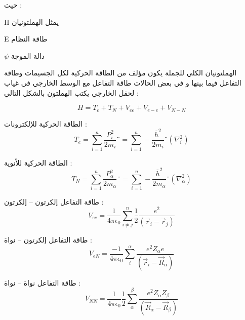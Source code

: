 حيث :
\begin{list}{}{}
	\item 
	H  يمثل الهملتونيان 
	\item 
	E  طاقة النظام
	\item 
	$ \psi $ دالة الموجة 
\end{list}

الهملتونيان الكلي للجملة يكون مؤلف من الطاقة الحركية لكل الجسيمات وطاقة التفاعل فيما بينها و في بعض الحالات طاقة التفاعل مع الوسط الخارجي في غياب لحقل الخارجي يكتب الهملتون بالشكل التالي :
\begin{list}{}{}
	
	\item 
	\begin{equation}\label{}
		H = T_e + T_N + V_{ee} + V_{e-e} + V_{N-N}
	\end{equation}
	
	\item  
	الطاقة الحركية للإلكترونات :
	\begin{equation}\label{}
		T_{e} = \sum_{i=1}^n \frac{ P_{i} ^2 }{ 2m_{i} }¨ =  \sum_{i=1}^n -\frac{ \bar{h} ^{2}  }{ 2m_{i} }¨( \nabla_{i}^{2} )
	\end{equation}
	
	\item
	الطاقة الحركية للأنوية :
	\begin{equation}\label{}
		T_{N} = \sum_{i=1}^n \frac{ P_{\alpha} ^2 }{ 2m_{\alpha} }¨ =  \sum_{i=1}^n -\frac{ \bar{h} ^{2}  }{ 2m_{\alpha} }¨( \nabla_{\alpha}^{2} )
	\end{equation}
	
	\item
	طاقة التفاعل إلكرتون – إلكرتون :
	\begin{equation}\label{}
		V_{ee} = \dfrac{1}{4\pi \epsilon_{0} } \sum_{i‫≠‬j}^n \frac{1}{2} \dfrac{e^{2}}{(\vec{r}_{i} - \vec{r}_{j})}
	\end{equation}
	
	\item
	طاقة التفاعل إلكرتون – نواة :
	\begin{equation}\label{}
		V_{eN} = \dfrac{-1}{4\pi \epsilon_{0} } \sum_{i}^\alpha  \dfrac{e^{2}Z_{\alpha} e}{(\vec{r}_{i} - \vec{R}_{\alpha})}
	\end{equation}
	
	\item
	طاقة التفاعل نواة – نواة :
	\begin{equation}\label{}
		V_{NN} = \dfrac{1}{4\pi \epsilon_{0} } \dfrac{1}{2} \sum_{\alpha}^\beta  \dfrac{e^{2}Z_{\alpha} Z_{\beta} }{(\vec{R}_{\alpha} - \vec{R}_{\beta})}
	\end{equation}
	
\end{list}

